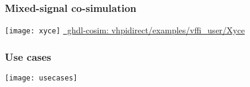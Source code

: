 \documentclass[xcolor={usenames,dvipsnames}]{beamer}
\begin{document}
\begin{frame}
\frametitle{Mixed-signal co-simulation}
\centering
\texttt{[image: xyce]}
\vfill
\Large
\href{https://ghdl.github.io/ghdl-cosim/vhpidirect/examples/vffi_user.html\#xyce}{\faGlobe~ghdl-cosim: vhpidirect/examples/vffi\_user/Xyce}
\end{frame}

\begin{frame}
\frametitle{Use cases}
\centering
\texttt{[image: usecases]}
\end{frame}
\end{document}
